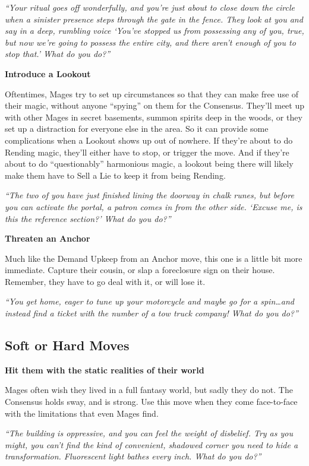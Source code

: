 \documentclass[
  oneside,
  statementpaper,
  9pt]{memoir}
\begin{document}
\emph{``Your ritual goes off wonderfully, and you're just about to close
down the circle when a sinister presence steps through the gate in the
fence. They look at you and say in a deep, rumbling voice `You've
stopped us from possessing any of you, true, but now we're going to
possess the entire city, and there aren't enough of you to stop that.'
What do you do?''}

\textbf{Introduce a Lookout}

Oftentimes, Mages try to set up circumstances so that they can make free
use of their magic, without anyone ``spying'' on them for the Consensus.
They'll meet up with other Mages in secret basements, summon spirits
deep in the woods, or they set up a distraction for everyone else in the
area. So it can provide some complications when a Lookout shows up out
of nowhere. If they're about to do Rending magic, they'll either have to
stop, or trigger the move. And if they're about to do ``questionably''
harmonious magic, a lookout being there will likely make them have to
Sell a Lie to keep it from being Rending.

\emph{``The two of you have just finished lining the doorway in chalk
runes, but before you can activate the portal, a patron comes in from
the other side. `Excuse me, is this the reference section?' What do you
do?''}

\textbf{Threaten an Anchor}

Much like the Demand Upkeep from an Anchor move, this one is a little
bit more immediate. Capture their cousin, or slap a foreclosure sign on
their house. Remember, they have to go deal with it, or will lose it.

\emph{``You get home, eager to tune up your motorcycle and maybe go for
a spin\ldots and instead find a ticket with the number of a tow truck
company! What do you do?''}

\hypertarget{soft-or-hard-moves}{%
\subsection{Soft or Hard Moves}\label{soft-or-hard-moves}}

\textbf{Hit them with the static realities of their world}

Mages often wish they lived in a full fantasy world, but sadly they do
not. The Consensus holds sway, and is strong. Use this move when they
come face-to-face with the limitations that even Mages find.

\emph{``The building is oppressive, and you can feel the weight of
disbelief. Try as you might, you can't find the kind of convenient,
shadowed corner you need to hide a transformation. Fluorescent light
bathes every inch. What do you do?''}
\end{document}
